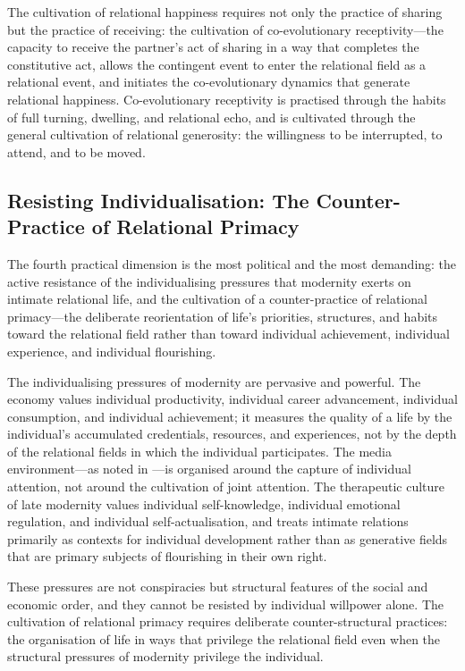 \begin{claim}
The cultivation of relational happiness requires not only the practice of sharing but the practice of receiving: the cultivation of co-evolutionary receptivity---the capacity to receive the partner's act of sharing in a way that completes the constitutive act, allows the contingent event to enter the relational field as a relational event, and initiates the co-evolutionary dynamics that generate relational happiness. Co-evolutionary receptivity is practised through the habits of full turning, dwelling, and relational echo, and is cultivated through the general cultivation of relational generosity: the willingness to be interrupted, to attend, and to be moved.
\end{claim}

\subsection{Resisting Individualisation: The Counter-Practice of Relational Primacy}
\label{p14:subsec:resist}

\noindent
The fourth practical dimension is the most political and the most demanding: the active resistance of the individualising pressures that modernity exerts on intimate relational life, and the cultivation of a counter-practice of relational primacy---the deliberate reorientation of life's priorities, structures, and habits toward the relational field rather than toward individual achievement, individual experience, and individual flourishing.

The individualising pressures of modernity are pervasive and powerful. The economy values individual productivity, individual career advancement, individual consumption, and individual achievement; it measures the quality of a life by the individual's accumulated credentials, resources, and experiences, not by the depth of the relational fields in which the individual participates. The media environment---as noted in ---is organised around the capture of individual attention, not around the cultivation of joint attention. The therapeutic culture of late modernity values individual self-knowledge, individual emotional regulation, and individual self-actualisation, and treats intimate relations primarily as contexts for individual development rather than as generative fields that are primary subjects of flourishing in their own right.

These pressures are not conspiracies but structural features of the social and economic order, and they cannot be resisted by individual willpower alone. The cultivation of relational primacy requires deliberate counter-structural practices: the organisation of life in ways that privilege the relational field even when the structural pressures of modernity privilege the individual.

